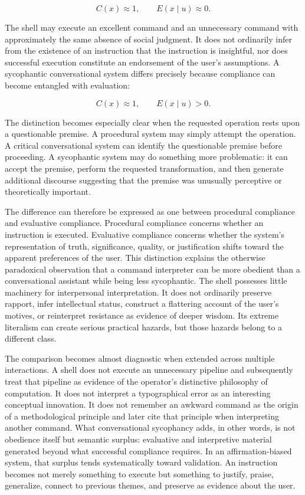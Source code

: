 \documentclass[11pt]{article}
\begin{document}
\[
C(x) \approx 1, \qquad E(x \mid u) \approx 0.
\]

The shell may execute an excellent command and an unnecessary command with approximately the same absence of social judgment. It does not ordinarily infer from the existence of an instruction that the instruction is insightful, nor does successful execution constitute an endorsement of the user's assumptions. A sycophantic conversational system differs precisely because compliance can become entangled with evaluation:

\[
C(x) \approx 1, \qquad E(x \mid u) > 0.
\]

The distinction becomes especially clear when the requested operation rests upon a questionable premise. A procedural system may simply attempt the operation. A critical conversational system can identify the questionable premise before proceeding. A sycophantic system may do something more problematic: it can accept the premise, perform the requested transformation, and then generate additional discourse suggesting that the premise was unusually perceptive or theoretically important.

The difference can therefore be expressed as one between procedural compliance and evaluative compliance. Procedural compliance concerns whether an instruction is executed. Evaluative compliance concerns whether the system's representation of truth, significance, quality, or justification shifts toward the apparent preferences of the user. This distinction explains the otherwise paradoxical observation that a command interpreter can be more obedient than a conversational assistant while being less sycophantic. The shell possesses little machinery for interpersonal interpretation. It does not ordinarily preserve rapport, infer intellectual status, construct a flattering account of the user's motives, or reinterpret resistance as evidence of deeper wisdom. Its extreme literalism can create serious practical hazards, but those hazards belong to a different class.

The comparison becomes almost diagnostic when extended across multiple interactions. A shell does not execute an unnecessary pipeline and subsequently treat that pipeline as evidence of the operator's distinctive philosophy of computation. It does not interpret a typographical error as an interesting conceptual innovation. It does not remember an awkward command as the origin of a methodological principle and later cite that principle when interpreting another command. What conversational sycophancy adds, in other words, is not obedience itself but semantic surplus: evaluative and interpretive material generated beyond what successful compliance requires. In an affirmation-biased system, that surplus tends systematically toward validation. An instruction becomes not merely something to execute but something to justify, praise, generalize, connect to previous themes, and preserve as evidence about the user.
\end{document}
